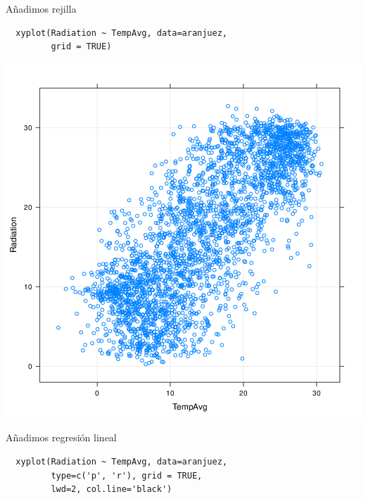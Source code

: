 \documentclass[xcolor={usenames,svgnames,dvipsnames}]{beamer}
\begin{document}
\begin{frame}[fragile,label=sec-3-4]{Añadimos rejilla}
 \lstset{language=R,label= ,caption= ,numbers=none}
\begin{lstlisting}
  xyplot(Radiation ~ TempAvg, data=aranjuez,
         grid = TRUE)
\end{lstlisting}
\end{frame}

\begin{frame}[label=sec-3-5]{}
\includegraphics[width=.9\linewidth]{figs/xyplotPG.png}
\end{frame}


\begin{frame}[fragile,label=sec-3-6]{Añadimos regresión lineal}
 \lstset{language=R,label= ,caption= ,numbers=none}
\begin{lstlisting}
  xyplot(Radiation ~ TempAvg, data=aranjuez,
         type=c('p', 'r'), grid = TRUE,
         lwd=2, col.line='black')
\end{lstlisting}
\end{frame}
\end{document}
